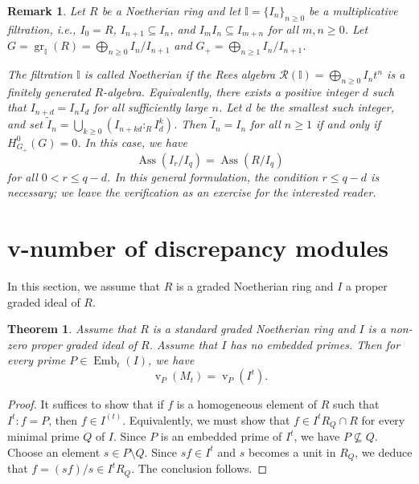 \documentclass[12pt]{amsart}
\def\v{\operatorname{v}}
\def\Emb{\operatorname{Emb}}
\newtheorem{theorem}[lemma]{Theorem}
\newtheorem{remark}[lemma]{Remark}
\begin{document}
\begin{remark}
Let $R$ be a Noetherian ring and let $\mathbb{I} = \{I_n\}_{n \ge 0}$ be a multiplicative filtration, i.e., $I_0 = R$, $I_{n+1} \subseteq I_n$, and $I_m I_n \subseteq I_{m+n}$ for all $m, n \ge 0$. Let $G = \operatorname{gr}_{\mathbb{I}}(R) = \bigoplus_{n \ge 0} I_n / I_{n+1}$ and $G_+ = \bigoplus_{n \ge 1} I_n / I_{n+1}$. 

The filtration $\mathbb{I}$ is called \textit{Noetherian} if the Rees algebra $\mathcal{R}(\mathbb{I}) = \bigoplus_{n \ge 0} I_n t^n$ is a finitely generated $R$-algebra. Equivalently, there exists a positive integer $d$ such that $I_{n+d} = I_n I_d$ for all sufficiently large $n$. Let $d$ be the smallest such integer, and set $\tilde{I}_n = \bigcup_{k \ge 0} (I_{n + kd} :_R I_d^k)$. Then $\tilde{I}_n = I_n$ for all $n \ge 1$ if and only if $H^0_{G_+}(G) = 0$. In this case, we have 
\[
\operatorname{Ass}(I_r / I_q) = \operatorname{Ass}(R / I_q)
\]
for all $0 < r \le q - d$. In this general formulation, the condition $r \le q - d$ is necessary; we leave the verification as an exercise for the interested reader.
\end{remark}

\section{v-number of discrepancy modules}\label{sec_v}

In this section, we assume that $R$ is a graded Noetherian ring and $I$ a proper graded ideal of $R$. 


\begin{theorem}\label{thm_v_M} 
Assume that $R$ is a standard graded Noetherian ring and $I$ is a non-zero proper graded ideal of $R$. Assume that $I$ has no embedded primes. Then for every prime $P \in \Emb_t(I)$, we have
$$\v_P(M_t) = \v_P(I^t).$$    
\end{theorem}
\begin{proof}
It suffices to show that if $f$ is a homogeneous element of $R$ such that $I^t : f = P$, then $f \in I^{(t)}$. Equivalently, we must show that $f \in I^t R_Q \cap R$ for every minimal prime $Q$ of $I$. Since $P$ is an embedded prime of $I^t$, we have $P \not\subseteq Q$. Choose an element $s \in P \setminus Q$. Since $s f \in I^t$ and $s$ becomes a unit in $R_Q$, we deduce that $f = (s f)/s \in I^t R_Q$. The conclusion follows.
\end{proof}
\end{document}
